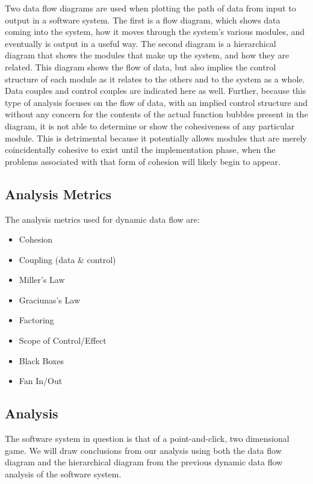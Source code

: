 \documentclass{article}
\begin{document}
		Two data flow diagrams are used when plotting the path of data from input to output in a software system. The first is a flow diagram, which shows data coming into the system, how it moves through the system's various modules, and eventually is output in a useful way. The second diagram is a hierarchical diagram that shows the modules that make up the system, and how they are related. This diagram shows the flow of data, but also implies the control structure of each module as it relates to the others and to the system as a whole. Data couples and control couples are indicated here as well. Further, because this type of analysis focuses on the flow of data, with an implied control structure and without any concern for the contents of the actual function bubbles present in the diagram, it is not able to determine or show the cohesiveness of any particular module. This is detrimental because it potentially allows modules that are merely coincidentally cohesive to exist until the implementation phase, when the problems associated with that form of cohesion will likely begin to appear. 
	\subsection{Analysis Metrics}
		The analysis metrics used for dynamic data flow are:
		\begin{itemize}
			\item Cohesion
			\item Coupling (data \& control)
			\item Miller's Law
			\item Graciunas's Law
			\item Factoring
			\item Scope of Control/Effect
			\item Black Boxes
			\item Fan In/Out
		\end{itemize}
	\subsection{Analysis}
		The software system in question is that of a point-and-click, two dimensional game. We will draw conclusions from our analysis using both the data flow diagram and the hierarchical diagram from the previous dynamic data flow analysis of the software system. 
\end{document}

